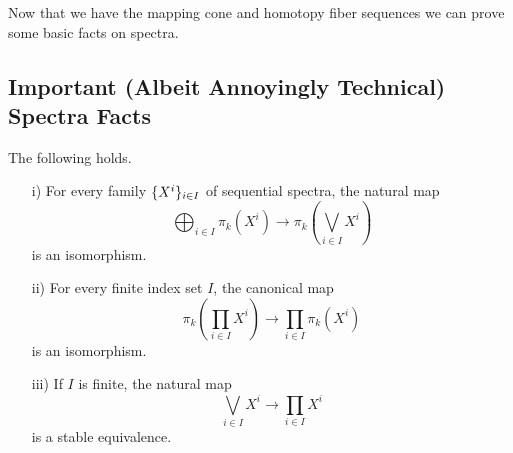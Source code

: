 Now that we have the mapping cone and homotopy fiber sequences we can prove some basic facts on spectra.

\subsection{Important (Albeit Annoyingly Technical) Spectra Facts}

\begin{proposition}\label{proposition:homotopy-of-wedges-and-products-of-spectra}
The following holds.
\begin{itemize}
    \item[i)] For every family $\{X^i\}_{i\in I}$ of sequential spectra, the natural map
    \[\bigoplus_{i\in I}\pi_k(X^i)\to\pi_k\left(\bigvee_{i\in I}X^i\right)\]
    is an isomorphism.
    \item[ii)] For every finite index set $I$, the canonical map
    \[\pi_k\left(\prod_{i\in I} X^i\right)\to\prod_{i\in I}\pi_k(X^i)\]
    is an isomorphism.
    \item[iii)] If $I$ is finite, the natural map
    \[\bigvee_{i\in I}X^i\to\prod_{i\in I}X^i\]
    is a stable equivalence.
\end{itemize}
\end{proposition}


